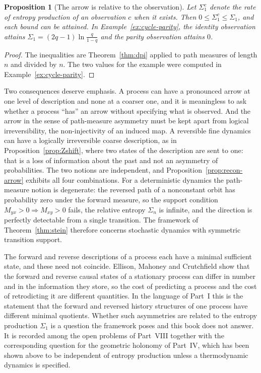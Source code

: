 \documentclass[11pt,oneside]{book}
\newtheorem{proposition}[theorem]{Proposition}
\theoremstyle{definition}
\theoremstyle{remark}
\begin{document}
\begin{proposition}[The arrow is relative to the observation]\label{prop:arrow-relative}
Let $\Sigma_1^{c}$ denote the rate of entropy production of an observation $c$ when it exists. Then $0\leq\Sigma_1^c\leq\Sigma_1$, and each bound can be attained. In Example~\ref{ex:cycle-parity}, the identity observation attains $\Sigma_1=(2q-1)\ln\frac{q}{1-q}$ and the parity observation attains $0$.
\end{proposition}

\begin{proof}
The inequalities are Theorem~\ref{thm:dpi} applied to path measures of length $n$ and divided by $n$. The two values for the example were computed in Example~\ref{ex:cycle-parity}.
\end{proof}

Two consequences deserve emphasis. A process can have a pronounced arrow at one level of description and none at a coarser one, and it is meaningless to ask whether a process ``has'' an arrow without specifying what is observed. And the arrow in the sense of path-measure asymmetry must be kept apart from logical irreversibility, the non-injectivity of an induced map. A reversible fine dynamics can have a logically irreversible coarse description, as in Proposition~\ref{prop:Zshift}, where two states of the description are sent to one: that is a loss of information about the past and not an asymmetry of probabilities. The two notions are independent, and Proposition~\ref{prop:recon-arrow} exhibits all four combinations. For a deterministic dynamics the path-measure notion is degenerate: the reversed path of a nonconstant orbit has probability zero under the forward measure, so the support condition $M_{yx}>0\Rightarrow M_{xy}>0$ fails, the relative entropy $\Sigma_n$ is infinite, and the direction is perfectly detectable from a single transition. The framework of Theorem~\ref{thm:stein} therefore concerns stochastic dynamics with symmetric transition support.

The forward and reverse descriptions of a process each have a minimal sufficient state, and these need not coincide. Ellison, Mahoney and Crutchfield \cite{ellison2009} show that the forward and reverse causal states of a stationary process can differ in number and in the information they store, so the cost of predicting a process and the cost of retrodicting it are different quantities. In the language of Part~I this is the statement that the forward and reversed history structures of one process have different minimal quotients. Whether such asymmetries are related to the entropy production $\Sigma_1$ is a question the framework poses and this book does not answer. It is recorded among the open problems of Part~VIII together with the corresponding question for the geometric holonomy of Part~IV, which has been shown above to be independent of entropy production unless a thermodynamic dynamics is specified.
\end{document}
